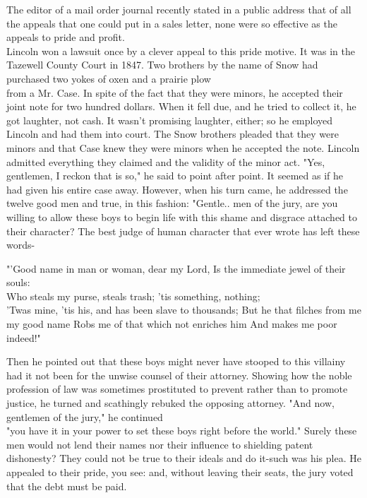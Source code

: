 \documentclass[10pt]{article}
\begin{document}
The editor of a mail order journal recently stated in a public address that of all the appeals that one could put in a sales letter, none were so effective as the appeals to pride and profit.\\
Lincoln won a lawsuit once by a clever appeal to this pride motive. It was in the Tazewell County Court in 1847. Two brothers by the name of Snow had purchased two yokes of oxen and a prairie plow\\
from a Mr. Case. In spite of the fact that they were minors, he accepted their joint note for two hundred dollars. When it fell due, and he tried to collect it, he got laughter, not cash. It wasn't promising laughter, either; so he employed Lincoln and had them into court. The Snow brothers pleaded that they were minors and that Case knew they were minors when he accepted the note. Lincoln admitted everything they claimed and the validity of the minor act. "Yes, gentlemen, I reckon that is so," he said to point after point. It seemed as if he had given his entire case away. However, when his turn came, he addressed the twelve good men and true, in this fashion: "Gentle.. men of the jury, are you willing to allow these boys to begin life with this shame and disgrace attached to their character? The best judge of human character that ever wrote has left these words-

\begin{displayquote}
"'Good name in man or woman, dear my Lord, Is the immediate jewel of their souls:\\
Who steals my purse, steals trash; 'tis something, nothing;\\
'Twas mine, 'tis his, and has been slave to thousands; But he that filches from me my good name Robs me of that which not enriches him And makes me poor indeed!"
\end{displayquote}

Then he pointed out that these boys might never have stooped to this villainy had it not been for the unwise counsel of their attorney. Showing how the noble profession of law was sometimes prostituted to prevent rather than to promote justice, he turned and scathingly rebuked the opposing attorney. "And now, gentlemen of the jury," he continued\\
"you have it in your power to set these boys right before the world." Surely these men would not lend their names nor their influence to shielding patent dishonesty? They could not be true to their ideals and do it-such was his plea. He appealed to their pride, you see: and, without leaving their seats, the jury voted that the debt must be paid.
\end{document}
